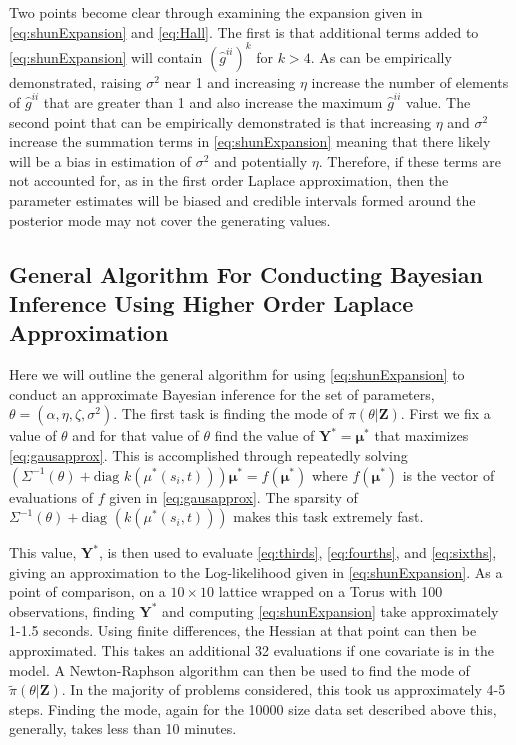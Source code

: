 \documentclass[11pt]{isuthesis}
\begin{document}
	Two points become clear through examining the expansion given in \eqref{eq:shunExpansion} and \eqref{eq:Hall}.  The first is that additional terms added to \eqref{eq:shunExpansion} will contain $(\hat{g}^{ii})^k$ for $k>4$.  As can be empirically demonstrated, raising $\sigma^2$ near 1 and increasing $\eta$ increase the number of elements of $\hat{g}^{ii}$ that are greater than 1 and also increase the maximum $\hat{g}^{ii}$ value.  The second point that can be empirically demonstrated is that increasing $\eta$ and $\sigma^2$ increase the summation terms in \eqref{eq:shunExpansion} meaning that there likely will be a bias in estimation of $\sigma^2$ and potentially $\eta$.  Therefore, if these terms are not accounted for, as in the first order Laplace approximation, then the parameter estimates will be biased and credible intervals formed around the posterior mode may not cover the generating values.
	
	\subsection{General Algorithm For Conducting Bayesian Inference Using Higher Order Laplace Approximation}
	
	Here we will outline the general algorithm for using \eqref{eq:shunExpansion} to conduct an approximate Bayesian inference for the set of parameters, $\theta=\left(\alpha,\eta,\zeta,\sigma^2\right)$.  The first task is finding the mode of $\pi(\theta|\boldsymbol{Z})$.  First we fix a value of $\theta$ and for that value of $\theta$ find the value of $\boldsymbol{Y}^*=\boldsymbol{\mu}^*$ that maximizes \eqref{eq:gausapprox}.  This is accomplished through repeatedly solving $\left(\Sigma^{-1}(\theta)+\text{diag }k(\mu^*(s_i,t))\right)\boldsymbol{\mu}^*=f(\boldsymbol{\mu}^*)$ where $f(\boldsymbol{\mu^*})$ is the vector of evaluations of $f$ given in \eqref{eq:gausapprox}.  The sparsity of $\Sigma^{-1}(\theta)+\text{diag }(k(\mu^*(s_i,t)))$ makes this task extremely fast.
	
	This value, $\boldsymbol{Y}^*$, is then used to evaluate \eqref{eq:thirds}, \eqref{eq:fourths}, and \eqref{eq:sixths}, giving an approximation to the Log-likelihood given in \eqref{eq:shunExpansion}.  As a point of comparison, on a $10 \times 10$ lattice wrapped on a Torus with 100 observations, finding $\boldsymbol{Y}^*$ and computing \eqref{eq:shunExpansion} take approximately 1-1.5 seconds.  Using finite differences, the Hessian at that point can then be approximated.  This takes an additional 32 evaluations if one covariate is in the model.  A Newton-Raphson algorithm can then be used to find the mode of $\tilde{\pi}(\theta|\boldsymbol{Z})$.  In the majority of problems considered, this took us approximately 4-5 steps.  Finding the mode, again for the 10000 size data set described above this, generally, takes less than 10 minutes.
	
\end{document}
